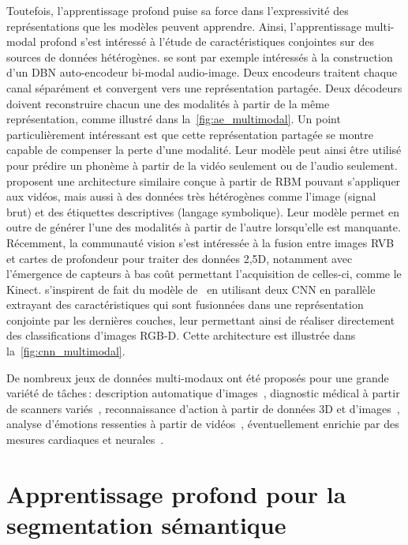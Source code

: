 Toutefois, l'apprentissage profond puise sa force dans l'expressivité des représentations que les modèles peuvent apprendre. Ainsi, l'apprentissage multi-modal profond s'est intéressé à l'étude de caractéristiques conjointes sur des sources de données hétérogènes. \citet{ngiam_multimodal_2011} se sont par exemple intéressés à la construction d'un \gls{DBN} auto-encodeur bi-modal audio-image. Deux encodeurs traitent chaque canal séparément et convergent vers une représentation partagée. Deux décodeurs doivent reconstruire chacun une des modalités à partir de la même représentation, comme illustré dans la~\cref{fig:ae_multimodal}. Un point particulièrement intéressant est que cette représentation partagée se montre capable de compenser la perte d'une modalité. Leur modèle peut ainsi être utilisé pour prédire un phonème à partir de la vidéo seulement ou de l'audio seulement.
\cite{srivastava_multimodal_2014} proposent une architecture similaire conçue à partir de \gls{RBM} pouvant s'appliquer aux vidéos, mais aussi à des données très hétérogènes comme l'image (signal brut) et des étiquettes descriptives (langage symbolique). Leur modèle permet en outre de générer l'une des modalités à partir de l'autre lorsqu'elle est manquante.
Récemment, la communauté vision s'est intéressée à la fusion entre images \gls{RVB} et cartes de profondeur pour traiter des données 2,5D, notamment avec l'émergence de capteurs à bas coût permettant l'acquisition de celles-ci, comme le Kinect. \citet{eitel_multimodal_2015} s'inspirent de fait du modèle de~\citet{ngiam_multimodal_2011} en utilisant deux \gls{CNN} en parallèle extrayant des caractéristiques qui sont fusionnées dans une représentation conjointe par les dernières couches, leur permettant ainsi de réaliser directement des classifications d'images \gls{RGB-D}. Cette architecture est illustrée dans la~\cref{fig:cnn_multimodal}.

De nombreux jeux de données multi-modaux ont été proposés pour une grande variété de tâches\,: description automatique d'images~\cite{hodosh_framing_2013}, diagnostic médical à partir de scanners variés~\cite{menze_multimodal_2015}, reconnaissance d'action à partir de données 3D et d'images~\cite{ofli_berkeley_2013}, analyse d'émotions ressenties à partir de vidéos~\cite{schuller_avec_2011}, éventuellement enrichie par des mesures cardiaques et neurales~\cite{ringeval_introducing_2013}.

\section{Apprentissage profond pour la segmentation sémantique}

